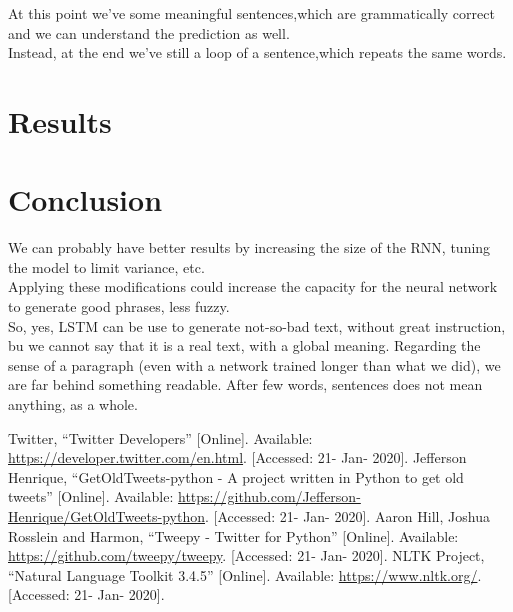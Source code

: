 \documentclass[conference]{IEEEtran}
\begin{document}

At this point we’ve some meaningful sentences,which are grammatically correct and we can understand the prediction as well.\\
Instead, at the end we’ve still a loop of a sentence,which repeats the same words.

\section{Results}

\section{Conclusion}

We can probably have better results by increasing the size of the RNN, tuning the model to limit variance, etc.\\
Applying these modifications could increase the capacity for the neural network to generate good phrases, less fuzzy.\\
So, yes, LSTM can be use to generate not-so-bad text, without great instruction, bu we cannot say that it is a real text, with a global meaning. Regarding the sense of a paragraph (even with a network trained longer than what we did), we are far behind something readable. After few words, sentences does not mean anything, as a whole.

\begin{thebibliography}{00}
 Twitter, ``Twitter Developers'' [Online]. Available: \url{https://developer.twitter.com/en.html}. [Accessed: 21- Jan- 2020].
 Jefferson Henrique, ``GetOldTweets-python - A project written in Python to get old tweets'' [Online]. Available: \url{https://github.com/Jefferson-Henrique/GetOldTweets-python}. [Accessed: 21- Jan- 2020].
 Aaron Hill, Joshua Rosslein and Harmon, ``Tweepy - Twitter for Python'' [Online]. Available: \url{https://github.com/tweepy/tweepy}. [Accessed: 21- Jan- 2020].
 NLTK Project, ``Natural Language Toolkit 3.4.5'' [Online]. Available: \url{https://www.nltk.org/}. [Accessed: 21- Jan- 2020].
\end{thebibliography}
\end{document}
